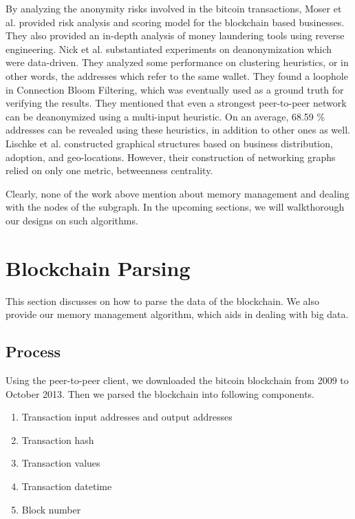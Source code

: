 \documentclass[runningheads,a4paper]{llncs}[2017/09/04]
\begin{document}
By analyzing the anonymity risks involved in the bitcoin transactions, Moser et al. \cite{moser2014towards, moser2013inquiry} provided risk analysis and scoring model for the blockchain based businesses. They also provided an in-depth analysis of money laundering tools using reverse engineering.
Nick et al. \cite{nick2015data} substantiated experiments on deanonymization which were data-driven.
They analyzed some performance on clustering heuristics, or in other words, the addresses which refer to the same wallet.
They found a loophole in Connection Bloom Filtering, which was eventually used as a ground truth for verifying the results.
They mentioned that even a strongest peer-to-peer network can be deanonymized using a multi-input heuristic.
On an average, 68.59 \% addresses can be revealed using these heuristics, in addition to other ones as well.
Lischke et al. \cite{lischke2016analyzing} constructed graphical structures based on business distribution, adoption, and geo-locations. However, their construction of networking graphs relied on only one metric, betweenness centrality.

Clearly, none of the work above mention about memory management and dealing with the nodes of the subgraph. In the upcoming sections, we will walkthorough our designs on such algorithms.

\section{Blockchain Parsing}

This section discusses on how to parse the data of the blockchain. We also provide our memory management algorithm, which aids in dealing with big data.

\subsection{Process}

Using the peer-to-peer client, we downloaded the bitcoin blockchain from 2009 to October 2013.
Then we parsed the blockchain into following components.

\begin{enumerate}
	\item Transaction input addresses and output addresses
	\item Transaction hash
	\item Transaction values
	\item Transaction datetime
	\item Block number
\end{enumerate}
\end{document}
